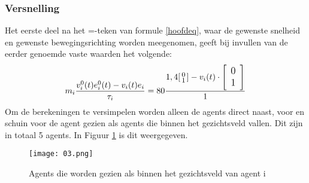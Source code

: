 \documentclass[12pt, letterpaper]{article}
\begin{document}
\subsubsection{Versnelling}
Het eerste deel na het =-teken van formule \ref{hoofdeq}, waar de gewenste snelheid en gewenste bewegingsrichting worden meegenomen, geeft bij invullen van de eerder genoemde vaste waarden het volgende:
\begin{equation}\label{01eq}
    m_{i} \large \frac{v_{i}^{0}(t)e_{i}^{0}(t) - v_{i}(t)e_{i}}{\tau_{i}} =  \normalsize 80 \large \frac{1,4 [ \begin{smallmatrix}  0 \\ 1 \end{smallmatrix} ]- v_{i}(t) \cdot\left[\begin{array}{l}
0 \\
1
\end{array}\right]}{1}
\end{equation} 
Om de berekeningen te versimpelen worden alleen de agents direct naast, voor en schuin voor de agent gezien als agents die binnen het gezichtsveld vallen. Dit zijn in totaal 5 agents. In Figuur \ref{gezichtsveld} is dit weergegeven.
\\ 
\begin{figure}[h]
\centering
\texttt{[image: 03.png]}
\caption{Agents die worden gezien als binnen het gezichtsveld van agent i}
\label{gezichtsveld}
\end{figure}
\end{document}

